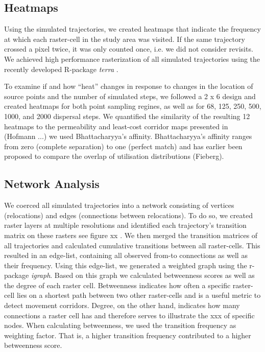 \documentclass[abstract=on,10pt,a4paper,bibliography=totocnumbered]{article}
\begin{document}
\subsection{Heatmaps}
Using the simulated trajectories, we created heatmaps that indicate the
frequency at which each raster-cell in the study area was visited. If the same
trajectory crossed a pixel twice, it was only counted once, i.e. we did not
consider revisits. We achieved high performance rasterization of all simulated
trajectories using the recently developed R-package \textit{terra}
\citep{Hijmans.2020}.


To examine if and how ``heat'' changes in response to changes in the location of
source points and the number of simulated steps, we followed a 2 x 6 design and
created heatmaps for both point sampling regines, as well as for 68, 125, 250,
500, 1000, and 2000 dispersal steps. We quantified the similarity of the
resulting 12 heatmaps to the permeability and least-cost corridor maps presented
in (Hofmann ...) we used Bhattacharyya's affinity. Bhattacharyya's affinity
ranges from zero (complete separation) to one (perfect match) and has earlier
been proposed to compare the overlap of utilisation distributions (Fieberg).


\subsection{Network Analysis}
We coerced all simulated trajectories into a network consisting of vertices
(relocations) and edges (connections between relocations). To do so, we created
raster layers at multiple resolutions and identified each trajectory's
transition matrix on these rasters see figure xx \citep{BastilleRousseau.2018}.
We then merged the transition matrices of all trajectories and calculated
cumulative transitions between all raster-cells. This resulted in an edge-list,
containing all observed from-to connections as well as their frequency. Using
this edge-list, we generated a weighted graph using the r-package
\textit{igraph}. Based on this graph we calculated betweenness scores as well as
the degree of each raster cell. Betweenness indicates how often a specific
raster-cell lies on a shortest path between two other raster-cells and is a
useful metric to detect movement corridors. Degree, on the other hand, indicates
how many connections a raster cell has and therefore serves to illustrate the
xxx of specific nodes. When calculating betweenness, we used the transition
frequency as weighting factor. That is, a higher transition frequency
contributed to a higher betweenness score.
\end{document}
